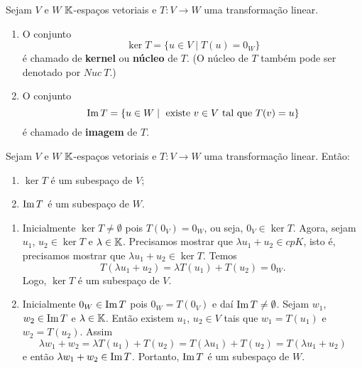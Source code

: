 \begin{definicao}
	Sejam $V$ e $W$ $\mathbb{K}$-espaços vetoriais e $T : V \to W$ uma transformação linear.
	\begin{enumerate}
		\item O conjunto
		\[
			\ker T = \{u \in V \mid T(u) = 0_W\}
		\]
		é chamado de \textbf{kernel} ou \textbf{núcleo} de $T$. (O núcleo de $T$ também pode ser denotado por $Nuc\ T$.)

		\item O conjunto
		\[
			{\rm Im\,} T = \{u \in W \mid \mbox{ existe } v \in V \mbox{ tal que } T(v) = u\}
		\]
		é chamado de \textbf{imagem} de $T$.
	\end{enumerate}
\end{definicao}

\begin{proposicao}
	Sejam $V$ e $W$ $\mathbb{K}$-espaços vetoriais e $T : V \to W$ uma transformação linear. Então:
	\begin{enumerate}
		\item $\ker T$ é um subespaço de $V$;
		\item ${\rm Im\,} T$ é um subespaço de $W$.
	\end{enumerate}
\end{proposicao}
\begin{prova}
	\begin{enumerate}
		\item Inicialmente $\ker T \ne \emptyset$ pois $T(0_V) = 0_W$, ou seja, $0_V \in \ker T$. Agora, sejam $u_1$, $u_2 \in \ker T$ e $\lambda \in \mathbb{K}$. Precisamos mostrar que $\lambda u_1 + u_2 \in cp{K}$, isto é, precisamos mostrar que $\lambda u_1 + u_2 \in \ker T$. Temos
		\[
			T(\lambda u_1 + u_2) = \lambda T(u_1) + T(u_2) = 0_W.
		\]
		Logo, $\ker T$ é um subespaço de $V$.

		\item Inicialmente $0_W \in {\rm Im\,} T$ pois $0_W = T(0_V)$ e daí ${\rm Im\,} T \ne \emptyset$. Sejam $w_1$, $w_2 \in {\rm Im\,} T$ e $\lambda \in \mathbb{K}$. Então existem $u_1$, $u_2 \in V$ tais que $w_1 = T(u_1)$ e $w_2 = T(u_2)$. Assim
		\[
			\lambda w_1 + w_2 = \lambda T(u_1) + T(u_2) = T(\lambda u_1) + T(u_2) = T(\lambda u_1 + u_2)
		\]
		e então $\lambda w_1 + w_2 \in {\rm Im\,} T$. Portanto, ${\rm Im\,} T$ é um subespaço de $W$.
	\end{enumerate}
\end{prova}

